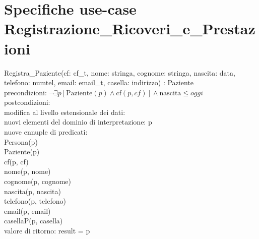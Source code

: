 \documentclass[a4paper,12pt]{report}
\begin{document}
      \section{Specifiche use-case Registrazione\_Ricoveri\_e\_Prestazioni}
        \hspace*{1cm}Registra\_Paziente(cf: cf\_t, nome: stringa, cognome: stringa, nascita: data, \\
        \hspace*{3cm}telefono: numtel, email: email\_t, casella: indirizzo) : Paziente \\
        \hspace*{2cm}precondizioni: $\neg \exists p [\text{Paziente}(p) \wedge \text{cf}(p, cf)] \wedge \text{nascita} \leq \textit{oggi}$ \\
        \hspace*{2cm}postcondizioni: \\
        \hspace*{3cm}modifica al livello estensionale dei dati: \\
        \hspace*{4cm}nuovi elementi del dominio di interpretazione: p \\
        \hspace*{4cm}nuove ennuple di predicati: \\
        \hspace*{5cm}Persona(p) \\
        \hspace*{5cm}Paziente(p) \\
        \hspace*{5cm}cf(p, cf) \\
        \hspace*{5cm}nome(p, nome) \\
        \hspace*{5cm}cognome(p, cognome) \\
        \hspace*{5cm}nascita(p, nascita) \\
        \hspace*{5cm}telefono(p, telefono) \\
        \hspace*{5cm}email(p, email) \\
        \hspace*{5cm}casellaP(p, casella) \\
        \hspace*{3cm}valore di ritorno: result = p \\
\end{document}
